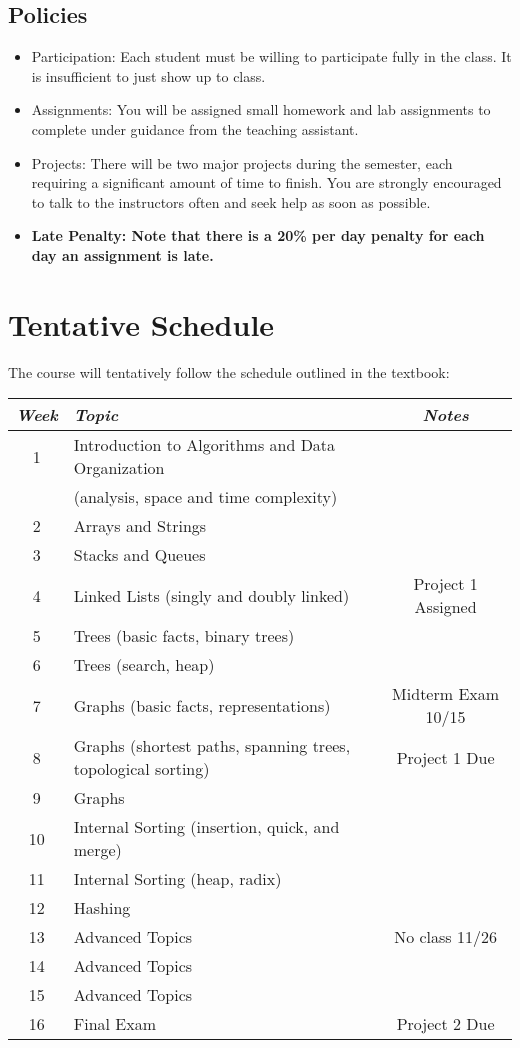 \documentclass{article}
\begin{document}
\subsection{Policies}
\begin{itemize}
\item Participation: Each student must be willing to participate fully in the class. It is insufficient to just show up to class. 
\item Assignments: You will be assigned small homework and lab assignments to complete under guidance from the teaching assistant.
\item Projects: There will be two major projects during the semester, each requiring a significant amount of time to finish. You are strongly encouraged to talk to the instructors often and seek help as soon as possible.
\item \textbf{Late Penalty: Note that there is a 20\% per day penalty for each day an assignment is late.}  
\end{itemize}


\newpage
\section{Tentative Schedule}
The course will tentatively follow the schedule outlined in the textbook:

\begin{table*}[htdp]
\begin{center}
\begin{tabular}{|c|l|c|}
\hline
{\em Week} & {\em Topic} & {\em Notes} \\
\hline
\hline
1  & Introduction to Algorithms and Data Organization & \\
   & (analysis, space and time complexity) & \\
2  & Arrays and Strings & \\
3  & Stacks and Queues & \\
4  & Linked Lists (singly and doubly linked) & Project 1 Assigned \\
5  & Trees (basic facts, binary trees) & \\
6  & Trees (search, heap) & \\
7  & Graphs (basic facts, representations) & Midterm Exam 10/15 \\
8  & Graphs (shortest paths, spanning trees, topological sorting) & Project 1 Due \\
9  & Graphs & \\
10 & Internal Sorting (insertion, quick, and merge) & \\
11 & Internal Sorting (heap, radix) & \\
12 & Hashing & \\
13 & Advanced Topics & No class 11/26 \\
14 & Advanced Topics & \\
15 & Advanced Topics & \\  
16 & Final Exam & Project 2 Due \\

\hline
\end{tabular}
\end{center}
\end{table*}%
\end{document}
